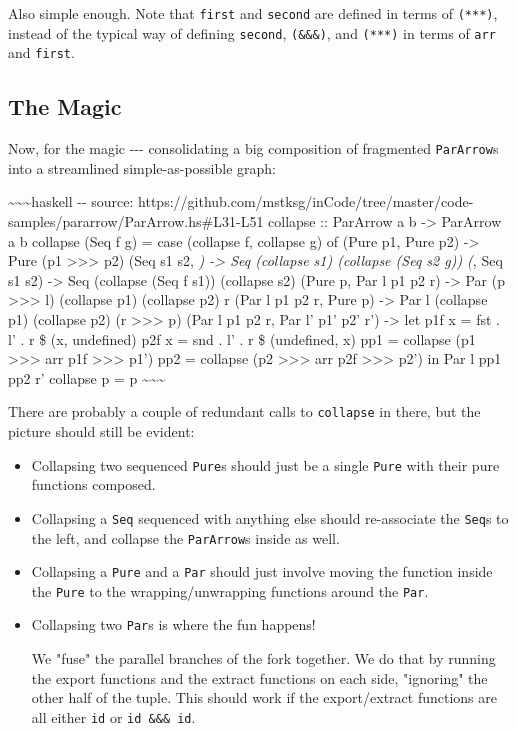 \documentclass[]{article}
\begin{document}
Also simple enough. Note that \texttt{first} and \texttt{second} are defined in
terms of \texttt{(***)}, instead of the typical way of defining \texttt{second},
\texttt{(\&\&\&)}, and \texttt{(***)} in terms of \texttt{arr} and
\texttt{first}.

\subsection{The Magic}

Now, for the magic -\/-\/- consolidating a big composition of fragmented
\texttt{ParArrow}s into a streamlined simple-as-possible graph:

\textasciitilde{}\textasciitilde{}\textasciitilde{}haskell -\/- source:
https://github.com/mstksg/inCode/tree/master/code-samples/pararrow/ParArrow.hs\#L31-L51
collapse :: ParArrow a b -\textgreater{} ParArrow a b collapse (Seq f g) = case
(collapse f, collapse g) of (Pure p1, Pure p2) -\textgreater{} Pure (p1
\textgreater{}\textgreater{}\textgreater{} p2) (Seq s1 s2, \emph{)
-\textgreater{} Seq (collapse s1) (collapse (Seq s2 g)) (}, Seq s1 s2)
-\textgreater{} Seq (collapse (Seq f s1)) (collapse s2) (Pure p, Par l p1 p2 r)
-\textgreater{} Par (p \textgreater{}\textgreater{}\textgreater{} l) (collapse
p1) (collapse p2) r (Par l p1 p2 r, Pure p) -\textgreater{} Par l (collapse p1)
(collapse p2) (r \textgreater{}\textgreater{}\textgreater{} p) (Par l p1 p2 r,
Par l' p1' p2' r') -\textgreater{} let p1f x = fst . l' . r \$ (x, undefined)
p2f x = snd . l' . r \$ (undefined, x) pp1 = collapse (p1
\textgreater{}\textgreater{}\textgreater{} arr p1f
\textgreater{}\textgreater{}\textgreater{} p1') pp2 = collapse (p2
\textgreater{}\textgreater{}\textgreater{} arr p2f
\textgreater{}\textgreater{}\textgreater{} p2') in Par l pp1 pp2 r' collapse p =
p \textasciitilde{}\textasciitilde{}\textasciitilde{}

There are probably a couple of redundant calls to \texttt{collapse} in there,
but the picture should still be evident:

\begin{itemize}
\item
  Collapsing two sequenced \texttt{Pure}s should just be a single \texttt{Pure}
  with their pure functions composed.
\item
  Collapsing a \texttt{Seq} sequenced with anything else should re-associate the
  \texttt{Seq}s to the left, and collapse the \texttt{ParArrow}s inside as well.
\item
  Collapsing a \texttt{Pure} and a \texttt{Par} should just involve moving the
  function inside the \texttt{Pure} to the wrapping/unwrapping functions around
  the \texttt{Par}.
\item
  Collapsing two \texttt{Par}s is where the fun happens!

  We "fuse" the parallel branches of the fork together. We do that by running
  the export functions and the extract functions on each side, "ignoring" the
  other half of the tuple. This should work if the export/extract functions are
  all either \texttt{id} or \texttt{id\ \&\&\&\ id}.
\end{itemize}
\end{document}
